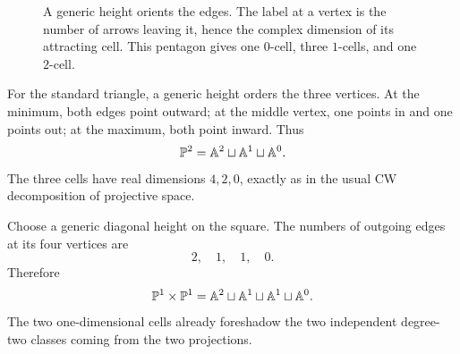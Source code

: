 \begin{figure}[ht]
\centering
{}
\caption{A generic height orients the edges. The label at a vertex is
the number of arrows leaving it, hence the complex dimension of its
attracting cell. This pentagon gives one \(0\)-cell, three
\(1\)-cells, and one \(2\)-cell.}
\label{fig:oriented-polygon-attracting-cells}
\end{figure}

\begin{example}
For the standard triangle, a generic height orders the three vertices.
At the minimum, both edges point outward; at the middle vertex, one
points in and one points out; at the maximum, both point inward. Thus
\[
\mathbb{P}^2
=
\mathbb{A}^2\sqcup\mathbb{A}^1\sqcup\mathbb{A}^0.
\]
The three cells have real dimensions \(4,2,0\), exactly as in the
usual CW decomposition of projective space.
\end{example}

\begin{example}
Choose a generic diagonal height on the square. The numbers of outgoing
edges at its four vertices are
\[
2,\quad1,\quad1,\quad0.
\]
Therefore
\[
\mathbb{P}^1\times\mathbb{P}^1
=
\mathbb{A}^2\sqcup\mathbb{A}^1\sqcup\mathbb{A}^1\sqcup\mathbb{A}^0.
\]
The two one-dimensional cells already foreshadow the two independent
degree-two classes coming from the two projections.
\end{example}

